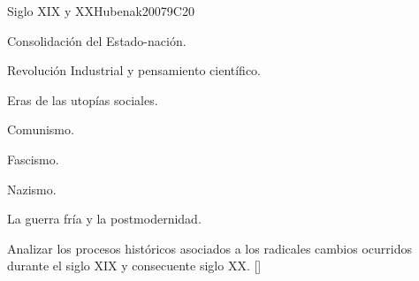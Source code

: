 \begin{syllabus}
\begin{unit}{}{Siglo XIX y XX}{Hubenak2007}{9}{C20}
\begin{topics}
	\item Consolidación del Estado-nación.
	\item Revolución Industrial y pensamiento científico.
	\item Eras de las utopías sociales.
	      \begin{subtopics}
		\item Comunismo.
		\item Fascismo.
		\item Nazismo.
	      \end{subtopics}
	\item La guerra fría y la postmodernidad.
\end{topics}
\begin{learningoutcomes}
	\item Analizar los procesos históricos asociados a los radicales cambios ocurridos durante el siglo XIX y consecuente siglo XX. [\Familiarity]
\end{learningoutcomes}
\end{unit}



\begin{coursebibliography}
\end{coursebibliography}

\end{syllabus}
